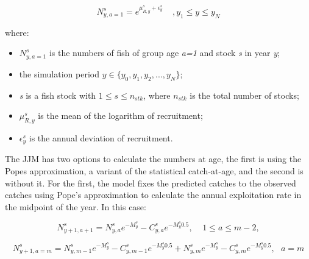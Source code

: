 \documentclass{article}
\begin{document}
\begin{equation}
N^s_{y,a=1}=e^{\mu_{R,y}^s+\epsilon_{y}^s}  \ \ \ \ \ , y_{1}\leq y \leq y_{N}
\end{equation}

where:
\begin{itemize}
    \item $N^s_{y,a=1}$ is the numbers of fish of group age \textit{a=1} and stock \textit{s} in year \textit{y};
    \item the simulation period ${y \in \{y_{0}, y_1, y_2,..., y_{N}\}}$; 
    
    \item \textit{s} is a fish stock with $1\leq s \leq n_{stk}$, where $n_{stk}$ is the total number of stocks; 
    
      
    
    \item $\mu_{R,y}^s$ is the mean  of the logarithm of recruitment;

    \item $\epsilon_{y}^s$ is the annual deviation of recruitment.
    
\end{itemize}

The JJM has two options to calculate the numbers at age, the first is using the Popes approximation,  a variant of the statistical catch-at-age, and the second is without it. For the first, the model fixes the predicted catches to the observed catches using Pope's approximation to calculate the annual exploitation rate in the midpoint of the year. In this case:

\begin{equation}
N^{s}_{y+1,a+1}=N^s_{y,a}e^{-M^s_y}-C^s_{y,a}e^{-M^s_y 0.5}, \ \ \ \ \ 1\leq a \leq m-2,
\end{equation}
    
\begin{equation}
N^s_{y+1,a=m}=N^s_{y,m-1}e^{-M^s_y}-C^s_{y,m-1}e^{-M^s_y 0.5}+N^s_{y,m}e^{-M^s_y}-C^s_{y,m}e^{-M^s_y 0.5}, \ \ \ a = m
\end{equation}
\end{document}
